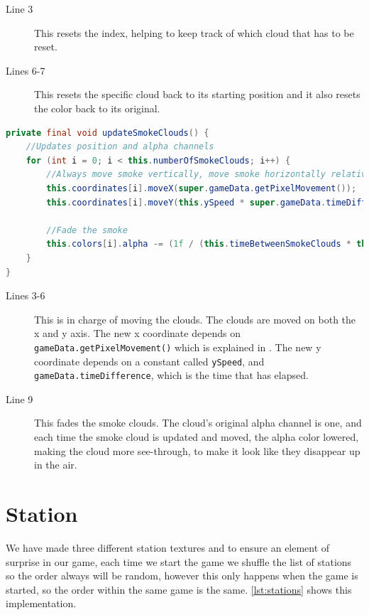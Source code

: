 \begin{description}
\item[Line 3] This resets the index, helping to keep track of which cloud that has to be reset. 
\item[Lines 6-7] This resets the specific cloud back to its starting position and it also resets the color back to its original. 
\end{description}
 
\begin{lstlisting}[language=java,firstnumber=1,caption={Function handling the updating of a smoke cloud.},label=lst:updatesmokeclouds]
private final void updateSmokeClouds() {
    //Updates position and alpha channels
    for (int i = 0; i < this.numberOfSmokeClouds; i++) {
        //Always move smoke vertically, move smoke horizontally relative to the train speed.
        this.coordinates[i].moveX(super.gameData.getPixelMovement());
        this.coordinates[i].moveY(this.ySpeed * super.gameData.timeDifference);
        
        //Fade the smoke
        this.colors[i].alpha -= (1f / (this.timeBetweenSmokeClouds * this.numberOfSmokeClouds)) * super.gameData.timeDifference;
    }
}
\end{lstlisting}

\begin{description}
\item[Lines 3-6] This is in charge of moving the clouds. The clouds are moved on both the x and y axis. The new x coordinate depends on \lstinline|gameData.getPixelMovement()| which is explained in . The new y coordinate depends on a constant called \lstinline|ySpeed|, and \lstinline|gameData.timeDifference|, which is the time that has elapsed.
\item[Line 9] This fades the smoke clouds. The cloud's original alpha channel is one, and each time the smoke cloud is updated and moved, the alpha color lowered, making the cloud more see-through, to make it look like they disappear up in the air. 
\end{description}

\section{Station}

We have made three different station textures and to ensure an element of surprise in our game, each time we start the game we shuffle the list of stations so the order always will be random, however this only happens when the game is started, so the order within the same game is the same. \autoref{lst:stations} shows this implementation.
 
